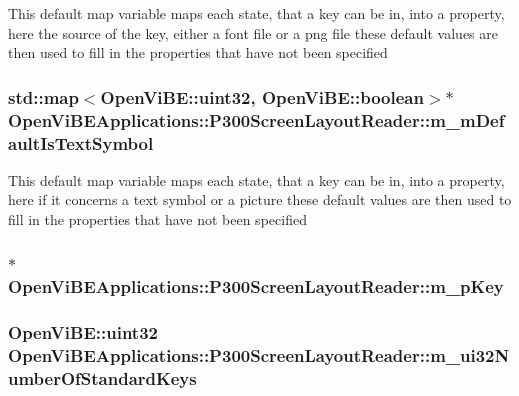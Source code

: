 This default map variable maps each state, that a key can be in, into a property, here the source of the key, either a font file or a png file these default values are then used to fill in the properties that have not been specified \hypertarget{classOpenViBEApplications_1_1P300ScreenLayoutReader_ab7bb77c87777335f86da388594f8f61d}{
\subsubsection[{m\_\-mDefaultIsTextSymbol}]{\setlength{\rightskip}{0pt plus 5cm}std::map$<$OpenViBE::uint32, OpenViBE::boolean$>$$\ast$ {\bf OpenViBEApplications::P300ScreenLayoutReader::m\_\-mDefaultIsTextSymbol}}}
\label{classOpenViBEApplications_1_1P300ScreenLayoutReader_ab7bb77c87777335f86da388594f8f61d}
This default map variable maps each state, that a key can be in, into a property, here if it concerns a text symbol or a picture these default values are then used to fill in the properties that have not been specified \hypertarget{classOpenViBEApplications_1_1P300ScreenLayoutReader_a998f88c4be7972464f515d7481756282}{
\subsubsection[{m\_\-pKey}]{$\ast$ {\bf OpenViBEApplications::P300ScreenLayoutReader::m\_\-pKey}}}
\label{classOpenViBEApplications_1_1P300ScreenLayoutReader_a998f88c4be7972464f515d7481756282}
\hypertarget{classOpenViBEApplications_1_1P300ScreenLayoutReader_a4b19abd34cc0f6601250c54e3568b199}{
\subsubsection[{m\_\-ui32NumberOfStandardKeys}]{\setlength{\rightskip}{0pt plus 5cm}OpenViBE::uint32 {\bf OpenViBEApplications::P300ScreenLayoutReader::m\_\-ui32NumberOfStandardKeys}}}
